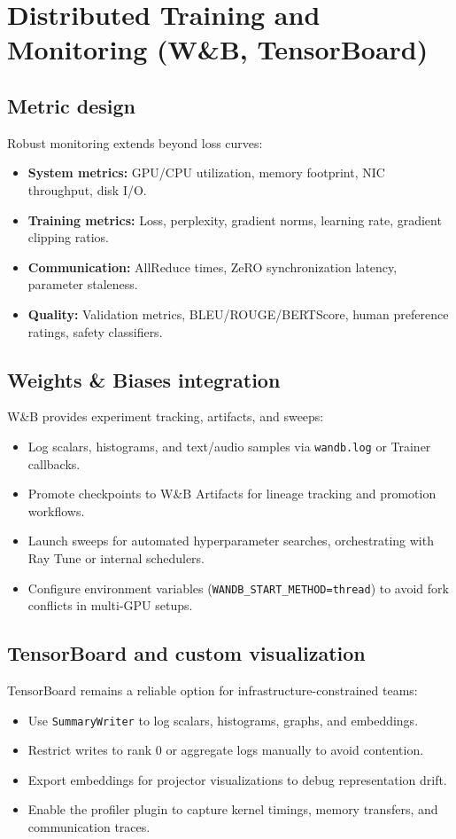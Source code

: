 \documentclass{article}
\begin{document}
\section{Distributed Training and Monitoring (W\&B, TensorBoard)}
\subsection{Metric design}
Robust monitoring extends beyond loss curves:
\begin{itemize}
  \item \textbf{System metrics:} GPU/CPU utilization, memory footprint, NIC throughput, disk I/O.
  \item \textbf{Training metrics:} Loss, perplexity, gradient norms, learning rate, gradient clipping ratios.
  \item \textbf{Communication:} AllReduce times, ZeRO synchronization latency, parameter staleness.
  \item \textbf{Quality:} Validation metrics, BLEU/ROUGE/BERTScore, human preference ratings, safety classifiers.
\end{itemize}

\subsection{Weights \& Biases integration}
W\&B provides experiment tracking, artifacts, and sweeps:
\begin{itemize}
  \item Log scalars, histograms, and text/audio samples via \texttt{wandb.log} or Trainer callbacks.
  \item Promote checkpoints to W\&B Artifacts for lineage tracking and promotion workflows.
  \item Launch sweeps for automated hyperparameter searches, orchestrating with Ray Tune or internal schedulers.
  \item Configure environment variables (\texttt{WANDB\_START\_METHOD=thread}) to avoid fork conflicts in multi-GPU setups.
\end{itemize}

\subsection{TensorBoard and custom visualization}
TensorBoard remains a reliable option for infrastructure-constrained teams:
\begin{itemize}
  \item Use \texttt{SummaryWriter} to log scalars, histograms, graphs, and embeddings.
  \item Restrict writes to rank 0 or aggregate logs manually to avoid contention.
  \item Export embeddings for projector visualizations to debug representation drift.
  \item Enable the profiler plugin to capture kernel timings, memory transfers, and communication traces.
\end{itemize}
\end{document}
